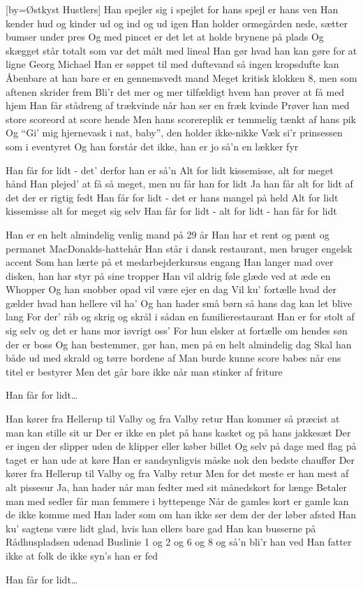 [by={Østkyst Hustlers}]
\beginverse
Han spejler sig i spejlet for hans spejl er hans ven
Han kender hud og kinder ud og ind og ud igen
Han holder ormegården nede, sætter bumser under pres
Og med pincet er det let at holde brynene på plads
Og skægget står totalt som var det målt med lineal
Han gør hvad han kan gøre for at ligne Georg Michael
Han er søppet til med duftevand så ingen kropsdufte kan
Åbenbare at han bare er en gennemsvedt mand
Meget kritisk klokken 8, men som aftenen skrider frem
Bli'r det mer og mer tilfældigt hvem han prøver at få med hjem
Han får stådreng af trækvinde når han ser en fræk kvinde
Prøver han med store scoreord at score hende
Men hans scorereplik er temmelig tænkt af hans pik
Og ``Gi' mig hjernevask i nat, baby'', den holder ikke-nikke
Væk si'r prinsessen som i eventyret
Og han forstår det ikke, han er jo så'n en lækker fyr
\endverse

\beginchorus
Han får for lidt - det' derfor han er så'n
Alt for lidt kissemisse, alt for meget hånd
Han plejed' at få så meget, men nu får han for lidt
Ja han får alt for lidt af det der er rigtig fedt
Han får for lidt - det er hans mangel på held
Alt for lidt kissemisse alt for meget sig selv
Han får for lidt - alt for lidt - han får for lidt
\endchorus

\beginverse
Han er en helt almindelig venlig mand på 29 år
Han har et rent og pænt og permanet MacDonalds-hattehår
Han står i dansk restaurant, men bruger engelsk accent
Som han lærte på et medarbejderkursus engang
Han langer mad over disken, han har styr på sine tropper
Han vil aldrig føle glæde ved at æde en Whopper
Og han snobber opad vil være ejer en dag
Vil ku' fortælle hvad der gælder hvad han hellere vil ha'
Og han hader små børn så hans dag kan let blive lang
For der' råb og skrig og skrål i sådan en familierestaurant
Han er for stolt af sig selv og det er hans mor iøvrigt oss'
For hun elsker at fortælle om hendes søn der er boss
Og han bestemmer, gør han, men på en helt almindelig dag
Skal han både ud med skrald og tørre bordene af
Man burde kunne score babes når ens titel er bestyrer
Men det går bare ikke når man stinker af friture
\endverse

\beginchorus
Han får for lidt\dots
\endchorus

\beginverse
Han kører fra Hellerup til Valby og fra Valby retur
Han kommer så præcist at man kan stille sit ur
Der er ikke en plet på hans kasket og på hans jakkesæt
Der er ingen der slipper uden de klipper eller køber billet
Og selv på dage med flag på taget er han ude at køre
Han er sandsynligvis måske nok den bedste chauffør
Der kører fra Hellerup til Valby og fra Valby retur
Men for det meste er han mest af alt pissesur
Ja, han hader når man fedter med sit månedskort for længe
Betaler man med sedler får man femmere i byttepenge
Når de gamles kort er gamle kan de ikke komme med
Han lader som om han ikke ser dem der der løber afsted
Han ku' sagtens være lidt glad, hvis han ellers bare gad
Han kan busserne på Rådhuspladsen udenad
Buslinie 1 og 2 og 6 og 8 og så'n bli'r han ved
Han fatter ikke at folk de ikke syn's han er fed
\endverse

\beginchorus
Han får for lidt\dots
\endchorus
\endsong
